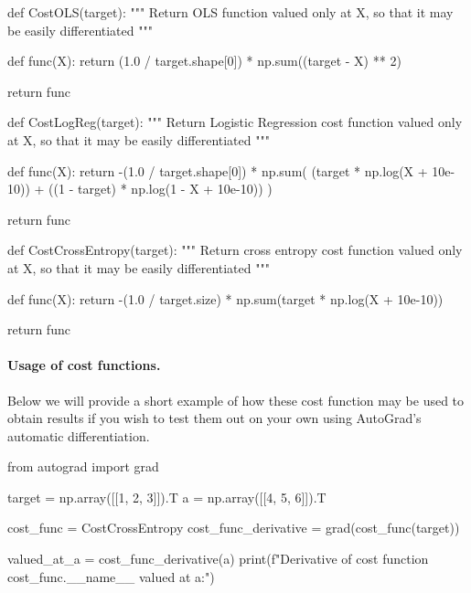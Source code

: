 \documentclass[%
oneside,                 %
final,                   %
10pt]{article}
\begin{document}
\bpycod
def CostOLS(target):
    """
    Return OLS function valued only at X, so
    that it may be easily differentiated
    """

    def func(X):
        return (1.0 / target.shape[0]) * np.sum((target - X) ** 2)

    return func


def CostLogReg(target):
    """
    Return Logistic Regression cost function
    valued only at X, so that it may be easily differentiated
    """

    def func(X):
        return -(1.0 / target.shape[0]) * np.sum(
            (target * np.log(X + 10e-10)) + ((1 - target) * np.log(1 - X + 10e-10))
        )

    return func


def CostCrossEntropy(target):
    """
    Return cross entropy cost function valued only at X, so
    that it may be easily differentiated
    """
    
    def func(X):
        return -(1.0 / target.size) * np.sum(target * np.log(X + 10e-10))

    return func


\epycod


\paragraph{Usage of cost functions.}
Below we will provide a short example of how these cost function may
be used to obtain results if you wish to test them out on your own
using AutoGrad's automatic differentiation.












\bpycod
from autograd import grad

target = np.array([[1, 2, 3]]).T
a = np.array([[4, 5, 6]]).T

cost_func = CostCrossEntropy
cost_func_derivative = grad(cost_func(target))

valued_at_a = cost_func_derivative(a)
print(f"Derivative of cost function {cost_func.__name__} valued at a:")

\epycod
\end{document}
